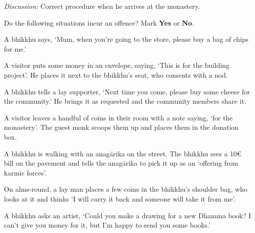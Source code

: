 \begin{exam}{\autoExamName}
    \emph{Discussion:} Correct procedure when he arrives at the monastery.

  \problemDivide

  \begin{problem*}

    Do the following situations incur an offence? Mark \textbf{Yes} or \textbf{No}.

    \bigskip

    \begin{parts}

    \item {} A bhikkhu says, `Mum, when you're going to the store, please
    buy a bag of chips for me.'

    \bigskip

    \item {} A visitor puts some money in an envelope, saying, `This is for
      the building project'. He places it next to the bhikkhu's seat, who
      consents with a nod.

    \bigskip

    \item {} A bhikkhu tells a lay supporter, `Next time you come, please
      buy some cheese for the community.' He brings it as requested and the
      community members share it.

    \bigskip

    \item {} A visitor leaves a handful of coins in their room with a note saying, `for the monastery'.
      The guest monk scoops them up and places them in the donation box.

    \bigskip

    \item {} A bhikkhu is walking with an anagārika on the street. The
      bhikkhu sees a 10€ bill on the pavement and tells the anagārika to pick it
      up as an `offering from karmic forces'.

    \bigskip

    \item {} On alms-round, a lay man places a few coins in the bhikkhu's
      shoulder bag, who looks at it and thinks `I will carry it back and someone
      will take it from me'.

    \bigskip

    \item {} A bhikkhu asks an artist, `Could you make a drawing for a new
      Dhamma book? I can't give you money for it, but I'm happy to send you some
      books.'

    \end{parts}
    
  \end{problem*}

\end{exam}
